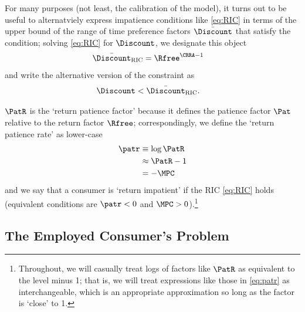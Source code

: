 \documentclass{handout}
\begin{document}
For many purposes (not least, the calibration of the model), it turns out to be useful to alternatviely express
impatience conditions like \eqref{eq:RIC} in terms of the upper bound of the range of time preference
factors $\bar{\Discount}$ that satisfy the condition; solving \eqref{eq:RIC} for $\Discount$, we designate this 
object \providecommand{\DiscountMaxRIC}{\ensuremath{\bar{\Discount}_{\text{RIC}}}}
\begin{equation}\begin{gathered}\begin{aligned}
  \DiscountMaxRIC & =  \Rfree^{\CRRA-1}
\end{aligned}\end{gathered}\end{equation}
and write the alternative version of the constraint as 
\begin{equation}\begin{gathered}\begin{aligned}
  \Discount & <  \DiscountMaxRIC \label{eq:DiscountMaxRIC}.
\end{aligned}\end{gathered}\end{equation}

$\PatR$ is the `return patience factor' because it defines the patience factor $\Pat$
relative to the return factor $\Rfree$; correspondingly, we define the `return
patience rate' as lower-case
\begin{equation}\begin{gathered}\begin{aligned}
   \patr & \equiv   \log \PatR \label{eq:patr}
\\ & \approx \PatR - 1 
\\ & =  -\MPCU
\end{aligned}\end{gathered}\end{equation}
and we say that a consumer is `return impatient' if the RIC \eqref{eq:RIC} holds (equivalent conditions are $\patr < 0$ and $\MPCU > 0$).\footnote{Throughout, we will casually treat logs of factors like $\PatR$ as equivalent to the level minus 1; that is, we will treat expressions like those in \eqref{eq:patr} as interchangeable, which is an appropriate approximation so long as the factor is `close' to 1.}

\subsection{The Employed Consumer's Problem}
\end{document}
